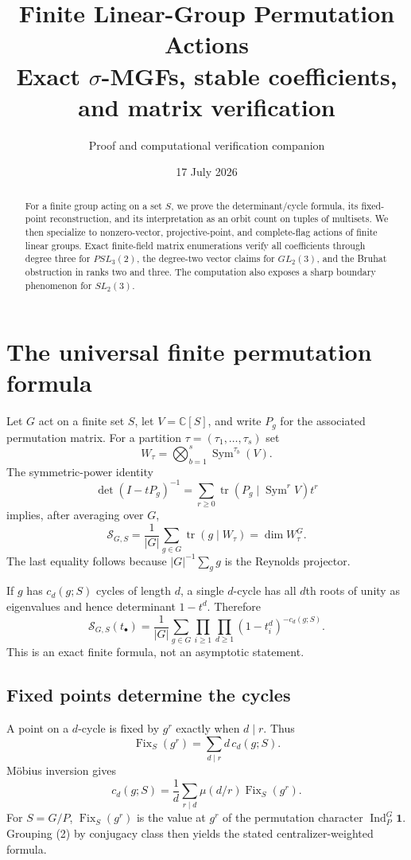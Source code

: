 \documentclass[10pt]{article}
\title{\color{navy}\textbf{Finite Linear-Group Permutation Actions}\\[2mm]
\large Exact $\sigma$-MGFs, stable coefficients, and matrix verification}
\author{Proof and computational verification companion}
\date{17 July 2026}
\newcommand{\Sym}{\operatorname{Sym}}
\newcommand{\Fix}{\operatorname{Fix}}
\newcommand{\Sg}{\mathcal S}
\begin{document}
\maketitle

\begin{abstract}
For a finite group acting on a set $S$, we prove the determinant/cycle formula,
its fixed-point reconstruction, and its interpretation as an orbit count on
tuples of multisets.  We then specialize to nonzero-vector, projective-point,
and complete-flag actions of finite linear groups.  Exact finite-field matrix
enumerations verify all coefficients through degree three for
$PSL_3(2)$, the degree-two vector claims for $GL_2(3)$, and the Bruhat
obstruction in ranks two and three.  The computation also exposes a sharp
boundary phenomenon for $SL_2(3)$.
\end{abstract}

\section{The universal finite permutation formula}
Let $G$ act on a finite set $S$, let $V=\mathbb C[S]$, and write $P_g$ for
the associated permutation matrix.  For a partition
$\tau=(\tau_1,\ldots,\tau_s)$ set
\[
 W_\tau=\bigotimes_{b=1}^s\Sym^{\tau_b}(V).
\]
The symmetric-power identity
\[
 \det(I-tP_g)^{-1}=\sum_{r\geq0}
 \operatorname{tr}\!\left(P_g\mid\Sym^rV\right)t^r
\]
implies, after averaging over $G$,
\begin{equation}
 [m_\tau]\Sg_{G,S}
 =\frac1{|G|}\sum_{g\in G}\operatorname{tr}(g\mid W_\tau)
 =\dim W_\tau^G.
\end{equation}
The last equality follows because $|G|^{-1}\sum_g g$ is the Reynolds
projector.

If $g$ has $c_d(g;S)$ cycles of length $d$, a single $d$-cycle has all
$d$th roots of unity as eigenvalues and hence determinant $1-t^d$.
Therefore
\begin{equation}
 \boxed{\Sg_{G,S}(t_\bullet)=\frac1{|G|}\sum_{g\in G}
 \prod_{i\geq1}\prod_{d\geq1}(1-t_i^d)^{-c_d(g;S)}.}
\end{equation}
This is an exact finite formula, not an asymptotic statement.

\subsection*{Fixed points determine the cycles}
A point on a $d$-cycle is fixed by $g^r$ exactly when $d\mid r$.  Thus
\[
 \Fix_S(g^r)=\sum_{d\mid r}d\,c_d(g;S).
\]
M\"obius inversion gives
\begin{equation}
 \boxed{c_d(g;S)=\frac1d\sum_{r\mid d}
 \mu(d/r)\Fix_S(g^r).}
\end{equation}
For $S=G/P$, $\Fix_S(g^r)$ is the value at $g^r$ of the permutation
character $\operatorname{Ind}_P^G\mathbf1$.  Grouping (2) by conjugacy class
then yields the stated centralizer-weighted formula.
\end{document}
